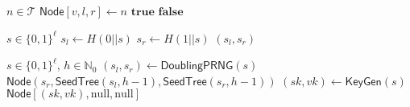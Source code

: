 \documentclass{article}
\begin{document}
\begin{algorithm}
\caption{$\mathsf{IsLeaf}: n \to \{\mathbf{true},\mathbf{false}\}$}\label{alg:IsLeaf}
\begin{algorithmic}[1]
\Require $n \in \mathcal{T}$
\State $\mathsf{\hyperref[def:Node]{Node}}[v,l,r] \gets n$
    \State \Return $\mathbf{true}$
\Else
    \State \Return $\mathbf{false}$
\EndIf
\end{algorithmic}
\end{algorithm}

\begin{algorithm}
\caption{$\mathsf{DoublingPRNG}: s \to (\{0,1\}^\ell, \{0,1\}^\ell)$}\label{alg:DoublingPRNG}
\begin{algorithmic}[1]
\Require $s \in \{0,1\}^\ell$
\State $s_l \gets H(0 || s)$
\State $s_r \gets H(1 || s)$
\State \Return $(s_l,s_r)$
\end{algorithmic}
\end{algorithm}

\begin{algorithm}
\caption{$\mathsf{SeedTree}: s, h \to \mathsf{\hyperref[def:Node]{Node}}  $}\label{alg:SeedTree}
\begin{algorithmic}[1]
\Require $s \in \{0,1\}^\ell$, $h\in \mathbb{N}_0$
    \State $(s_l,s_r) \gets \mathsf{\hyperref[alg:DoublingPRNG]{DoublingPRNG}}(s)$
    \State \Return $\mathsf{\hyperref[def:Node]{Node}}(s_r,\mathsf{\hyperref[alg:SeedTree]{SeedTree}}(s_l,h-1),\mathsf{\hyperref[alg:SeedTree]{SeedTree}}(s_r,h-1))$
\Else
    \State $(sk,vk) \gets \mathsf{\hyperref[def:KeyGen]{KeyGen}}(s)$
    \State \Return $\mathsf{\hyperref[def:Node]{Node}}[(sk,vk),\mathrm{null},\mathrm{null}]$
\EndIf
\end{algorithmic}
\end{algorithm}
\end{document}
